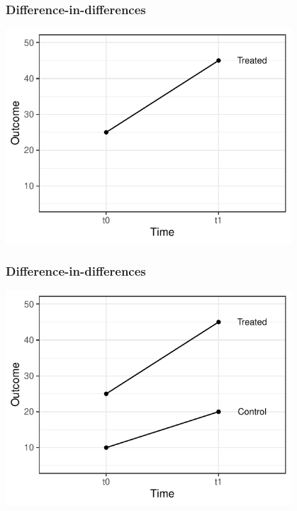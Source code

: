 \documentclass[aspectratio=43]{beamer}
\begin{document}
\begin{frame}
\frametitle{Difference-in-differences}
\centering

\includegraphics[width = 0.8\textwidth]{../img/did1}

\end{frame}

\begin{frame}
\frametitle{Difference-in-differences}
\centering

\includegraphics[width = 0.8\textwidth]{../img/did2}

\end{frame}
\end{document}
